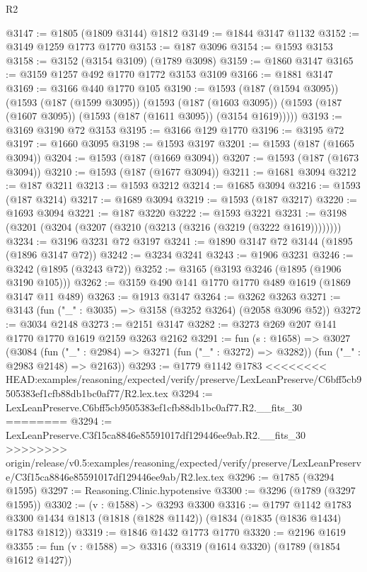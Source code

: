 \begin{lexlean}{R2}
\begin{coremodule}
{{{{{{{{{{{{{{{{{{{{{{{{{{{{{{{{{{{{{{{{{{{{{{{{{{{{{{{{{{{{{{{{{{{{{{{{{{{{{{{{{{{{{{{{{{{{@3147 := @1805 (@1809 @3144) @1812
@3149 := @1844 @3147 @1132
@3152 := @3149 @1259 @1773 @1770
@3153 := @187 @3096
@3154 := @1593 @3153
@3158 := @3152 (@3154 @3109) (@1789 @3098)
@3159 := @1860 @3147
@3165 := @3159 @1257 @492 @1770 @1772 @3153 @3109
@3166 := @1881 @3147
@3169 := @3166 @440 @1770 @105
@3190 := @1593
    (@187 (@1594 @3095))
    (@1593
      (@187 (@1599 @3095))
      (@1593
        (@187 (@1603 @3095))
        (@1593 (@187 (@1607 @3095)) (@1593 (@187 (@1611 @3095)) (@3154 @1619)))))
@3193 := @3169 @3190 @72 @3153
@3195 := @3166 @129 @1770
@3196 := @3195 @72
@3197 := @1660 @3095
@3198 := @1593 @3197
@3201 := @1593 (@187 (@1665 @3094))
@3204 := @1593 (@187 (@1669 @3094))
@3207 := @1593 (@187 (@1673 @3094))
@3210 := @1593 (@187 (@1677 @3094))
@3211 := @1681 @3094
@3212 := @187 @3211
@3213 := @1593 @3212
@3214 := @1685 @3094
@3216 := @1593 (@187 @3214)
@3217 := @1689 @3094
@3219 := @1593 (@187 @3217)
@3220 := @1693 @3094
@3221 := @187 @3220
@3222 := @1593 @3221
@3231 := @3198 (@3201 (@3204 (@3207 (@3210 (@3213 (@3216 (@3219 (@3222 @1619))))))))
@3234 := @3196 @3231 @72 @3197
@3241 := @1890 @3147 @72 @3144 (@1895 (@1896 @3147 @72))
@3242 := @3234 @3241
@3243 := @1906 @3231
@3246 := @3242 (@1895 (@3243 @72))
@3252 := @3165 (@3193 @3246 (@1895 (@1906 @3190 @105)))
@3262 := @3159 @490 @141 @1770 @1770 @489 @1619 (@1869 @3147 @11 @489)
@3263 := @1913 @3147
@3264 := @3262 @3263
@3271 := @3143 (fun ("_" : @3035) => @3158 (@3252 @3264) (@2058 @3096 @52))
@3272 := @3034 @2148
@3273 := @2151 @3147
@3282 := @3273 @269 @207 @141 @1770 @1770 @1619 @2159 @3263 @2162
@3291 := fun (s : @1658) =>
  @3027
    (@3084
      (fun ("_" : @2984) => @3271 (fun ("_" : @3272) => @3282))
      (fun ("_" : @2983 @2148) => @2163))
@3293 := @1779 @1142 @1783
<<<<<<<< HEAD:examples/reasoning/expected/verify/preserve/LexLeanPreserve/C6bff5cb9505383ef1cfb88db1bc0af77/R2.lex.tex
@3294 := LexLeanPreserve.C6bff5cb9505383ef1cfb88db1bc0af77.R2.__fits_30
========
@3294 := LexLeanPreserve.C3f15ca8846e85591017df129446ee9ab.R2.__fits_30
>>>>>>>> origin/release/v0.5:examples/reasoning/expected/verify/preserve/LexLeanPreserve/C3f15ca8846e85591017df129446ee9ab/R2.lex.tex
@3296 := @1785 (@3294 @1595)
@3297 := Reasoning.Clinic.hypotensive
@3300 := @3296 (@1789 (@3297 @1595))
@3302 := (v : @1588) -> @3293 @3300
@3316 := @1797
    @1142
    @1783
    @3300
    @1434
    @1813
    (@1818 (@1828 @1142))
    (@1834 (@1835 (@1836 @1434) @1783 @1812))
@3319 := @1846 @1432 @1773 @1770
@3320 := @2196 @1619
@3355 := fun (v : @1588) =>
  @3316
    (@3319
      (@1614 @3320)
      (@1789 (@1854 @1612 @1427))
}}}}}}}}}}}}}}}}}}}}}}}}}}}}}}}}}}}}}}}}}}}}}}}}}}}}}}}}}}}}}}}}}}}}}}}}}}}}}}}}}}}}}}}}}}}}
\end{coremodule}
\end{lexlean}
